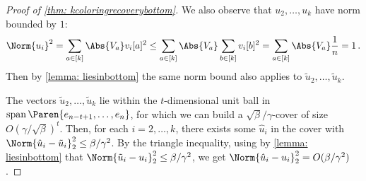 \begin{proof}[Proof of \cref{thm: kcoloringrecoverybottom}]
    We also observe that $u_2, \ldots, u_k$ have norm bounded by $1$:
    \[\Norm{u_i}^2 = \sum_{a\in[k]}\Abs{V_a}v_i[a]^2 \leq \sum_{a\in[k]}\Abs{V_a}\sum_{b\in[k]}v_i[b]^2 = \sum_{a \in [k]} \Abs{V_a} \frac{1}{n} =  1\,.\] 
    Then by \cref{lemma: liesinbottom} the same norm bound also applies to $\tilde{u}_2, \ldots, \tilde{u}_k$.



        


    The vectors $\tilde{u}_{2}, \ldots, \tilde{u}_k$ lie within the $t$-dimensional unit ball in $\operatorname{span}\Paren{e_{n-t+1}, \ldots, e_n}$, for which we can build a $\sqrt{\beta}/\gamma$-cover of size $O(\gamma/\sqrt{\beta})^t$.%
    Then, for each $i = 2, \ldots, k$, there exists some $\hat{u}_i$ in the cover with $\Norm{\hat{u}_i-\tilde{u}_i}_2^2\leq \beta/\gamma^2$.
    By the triangle inequality, using by \cref{lemma: liesinbottom} that $\Norm{\tilde{u}_i-u_i}_2^2\leq\beta/\gamma^2$, we get $\Norm{\hat{u}_i-u_i}_2^2=O(\beta/\gamma^2)$.


\end{proof}
